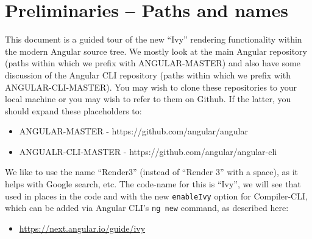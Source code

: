 \section{Preliminaries – Paths and names}

This document is a guided tour of the new “Ivy” rendering functionality within the
modern Angular source tree. We mostly look at the main Angular repository (paths
within which we prefix with ANGULAR-MASTER) and also have some discussion of the
Angular CLI repository (paths within which we prefix with ANGULAR-CLI-MASTER).
You may wish to clone these repositories to your local machine or you may wish to
refer to them on Github. If the latter, you should expand these placeholders to:

\begin{itemize}
  \item ANGULAR-MASTER - https://github.com/angular/angular
  \item ANGUALR-CLI-MASTER - https://github.com/angular/angular-cli
\end{itemize}

We like to use the name “Render3” (instead of “Render 3” with a space), as it helps
with Google search, etc. The code-name for this is “Ivy”, we will see that used in
places in the code and with the new
\texttt{enableIvy}
option for Compiler-CLI, which can be
added via Angular CLI’s
\texttt{ng new}
command, as described here:

\begin{itemize}
  \item \url{https://next.angular.io/guide/ivy}
\end{itemize}
